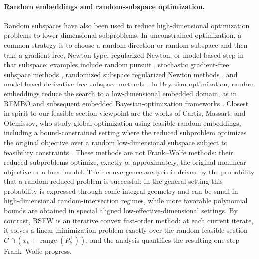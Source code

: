 \documentclass{article}
\begin{document}
\paragraph{Random embeddings and random-subspace optimization.}
Random subspaces have also been used to reduce high-dimensional optimization
problems to lower-dimensional subproblems. In unconstrained optimization, a
common strategy is to choose a random direction or random subspace and then take
a gradient-free, Newton-type, regularized Newton, or model-based step in that
subspace; examples include random pursuit
\cite{StichMullerGartner2013RandomPursuit}, stochastic gradient-free subspace
methods \cite{KozakBeckerDoostanTenorio2021Subspace}, randomized subspace
regularized Newton methods \cite{FujiPoirionTakeda2025RSRNM}, and
model-based derivative-free subspace methods
\cite{CartisRoberts2023SubspaceDFO}. In Bayesian optimization, random
embeddings reduce the search to a low-dimensional embedded domain, as in REMBO
\cite{WangZoghiHutterMathesonDeFreitas2013REMBO} and subsequent embedded
Bayesian-optimization frameworks
\cite{NayebiMunteanuPoloczek2019EmbeddedBO}. Closest in spirit to our
feasible-section viewpoint are the works of Cartis, Massart, and Otemissov,
who study global optimization using feasible random embeddings, including a
bound-constrained setting where the reduced subproblem optimizes the original
objective over a random low-dimensional subspace subject to feasibility
constraints
\cite{CartisMassartOtemissov2023BoundConstrained,CartisMassartOtemissov2023GlobalEmbeddings}.
These methods are not Frank--Wolfe methods: their reduced subproblems optimize,
exactly or approximately, the original nonlinear objective or a local model. Their convergence analysis is driven by the probability that a random reduced
problem is successful; in the general setting this probability is expressed
through conic integral geometry and can be small in high-dimensional
random-intersection regimes, while more favorable polynomial bounds are obtained
in special aligned low-effective-dimensional settings. By
contrast, RSFW is an iterative convex first-order method: at each current
iterate, it solves a linear minimization problem exactly over the random
feasible section
\(C\cap(x_k+\operatorname{range}(P_k^\top))\), and the analysis quantifies the
resulting one-step Frank--Wolfe progress.
\end{document}
